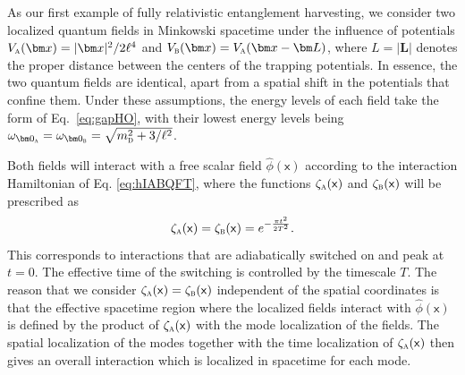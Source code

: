 \documentclass[letterpaper,12pt,titlepage,oneside,final]{book}
\newcommand{\mf}{\mathsf}%
\newcommand{\tc}[1]{\textsc{#1}}
\begin{document}
    As our first example of fully relativistic entanglement harvesting, we consider two localized quantum fields in Minkowski spacetime under the influence of potentials $V_\tc{a}(\bm x) = |\bm x|^2/2\ell^4$ and $V_\tc{b}(\bm x) = V_\tc{a}(\bm x - \bm L)$, where $L = |\bm L|$ denotes the proper distance between the centers of the trapping potentials. In essence, the two quantum fields are identical, apart from a spatial shift in the potentials that confine them. Under these assumptions, the energy levels of each field take the form of Eq.~\eqref{eq:gapHO}, with their lowest energy levels being $\omega_{\bm 0_\tc{a}} = \omega_{\bm 0_\tc{b}} = \sqrt{m_\tc{d}^2 +   3/\ell^2}$. 
    
    Both fields will interact with a free scalar field $\hat{\phi}(\mf x)$ according to the interaction Hamiltonian of Eq. \eqref{eq:hIABQFT}, where the functions $\zeta_\tc{a}(\mf x)$ and $\zeta_{\tc{b}}(\mf x)$ will be prescribed as
    \begin{equation}\label{eq:switching}
        \zeta_\tc{a}(\mf x) = \zeta_\tc{b}(\mf x) = e^{-\frac{{\pi} t^2}{2T^2}}.
    \end{equation}
    This corresponds to interactions that are adiabatically switched on and peak at $t = 0$. The effective time of the switching is controlled by the timescale $T$. The reason that we consider $\zeta_\tc{a}(\mf x) = \zeta_\tc{b}(\mf x)$ independent of the spatial coordinates is that the effective spacetime region where the localized fields interact with $\hat{\phi}(\mf x)$ is defined by the product of $\zeta_\tc{a}(\mf x)$ with the mode localization of the fields. The spatial localization of the modes together with the time localization of $\zeta_\tc{a}(\mf x)$ then gives an overall interaction which is localized in spacetime for each mode. %
\end{document}
